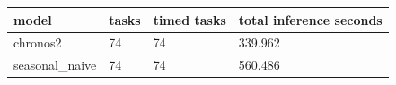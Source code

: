 \begin{tabular}{llll}
\toprule
model & tasks & timed tasks & total inference seconds \\
\midrule
chronos2 & 74 & 74 & 339.962 \\
seasonal\_naive & 74 & 74 & 560.486 \\
\bottomrule
\end{tabular}

